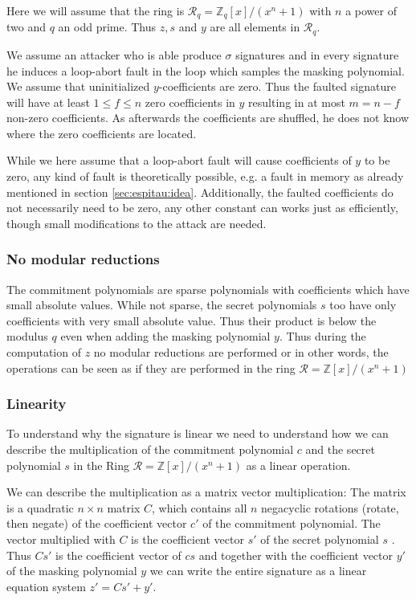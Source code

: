 Here we will assume that the ring is $\mathcal{R}_q = \mathds{Z}_{q}[x] / (x^{n} + 1)$ with $n$ a power of two and $q$ an odd prime. Thus $z, s$ and $y$ are all elements in $\mathcal{R}_q$.

We assume an attacker who is able produce $σ$ signatures and in every signature he induces a loop-abort fault in the loop which samples the masking polynomial.  We assume that uninitialized $y$-coefficients are zero. Thus the faulted signature will have at least $1 \leq f \leq n$ zero coefficients in $y$ resulting in at most $m = n - f$ non-zero coefficients. As afterwards the coefficients are shuffled, he does not know where the zero coefficients are located.

While we here assume that a loop-abort fault will cause coefficients of $y$ to be zero, any kind of fault is theoretically possible, e.g. a fault in memory as already mentioned in section \ref{sec:espitau:idea}. Additionally, the faulted coefficients do not necessarily need to be zero, any other constant can works just as efficiently, though small modifications to the attack are needed.


\subsubsection{No modular reductions} \label{sec:nomod}
The commitment polynomials are sparse polynomials with coefficients which have small absolute values. While not sparse, the secret polynomials $s$ too have only coefficients with very small absolute value. Thus their product is below the modulus $q$ even when adding the masking polynomial $y$.  Thus during the computation of $z$ no modular reductions are performed or in other words, the operations can be seen as if they are performed in the ring $\mathcal{R} = \mathds{Z}[x] / (x^{n} + 1)$

\subsubsection{Linearity}
\label{sec:linearity}
To understand why the signature is linear we need to understand how we can describe the multiplication of the commitment polynomial $c$ and the secret polynomial $s$ in the Ring  $\mathcal{R} = \mathds{Z}[x]/(x^n+1)$  as a linear operation.

We can describe the multiplication as a matrix vector multiplication: The matrix is a quadratic $n \times n$ matrix $C$, which contains all $n$ negacyclic rotations (rotate, then negate) of the coefficient vector $c'$ of the commitment polynomial. The vector multiplied with $C$ is the coefficient vector $s'$ of the secret polynomial $s$ \cite[p.~1845]{negacyclic}.
Thus $Cs'$ is the coefficient vector of  $cs$ and together with the coefficient vector $y'$ of the masking polynomial $y$ we can write the entire signature as a linear equation system $z' = Cs' + y'$. 

